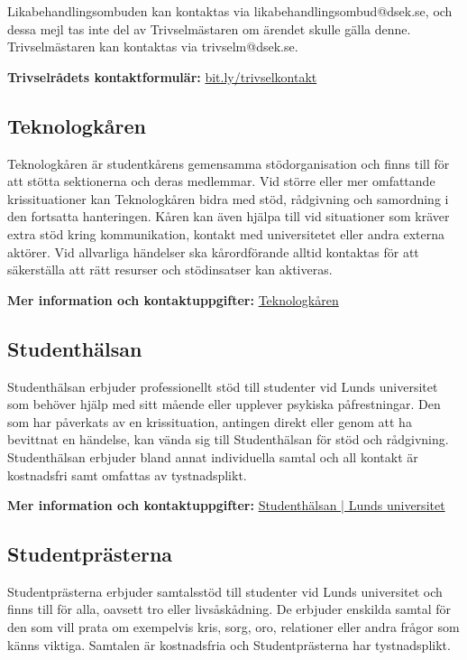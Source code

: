 \documentclass[pdfbookmarks,a4paper,11pt]{article}
\begin{document}
Likabehandlingsombuden kan kontaktas via likabehandlingsombud@dsek.se, och dessa mejl tas inte del av Trivselmästaren om ärendet skulle gälla denne. Trivselmästaren kan kontaktas via trivselm@dsek.se.

\textbf{Trivselrådets kontaktformulär:} \href{https://bit.ly/trivselkontakt}{bit.ly/trivselkontakt}

\subsection{Teknologkåren}

Teknologkåren är studentkårens gemensamma stödorganisation och finns till för att stötta sektionerna och deras medlemmar. Vid större eller mer omfattande krissituationer kan Teknologkåren bidra med stöd, rådgivning och samordning i den fortsatta hanteringen. Kåren kan även hjälpa till vid situationer som kräver extra stöd kring kommunikation, kontakt med universitetet eller andra externa aktörer. Vid allvarliga händelser ska kårordförande alltid kontaktas för att säkerställa att rätt resurser och stödinsatser kan aktiveras. 

\textbf{Mer information och kontaktuppgifter:} \href{https://www.tlth.se/}{Teknologkåren}

\subsection{Studenthälsan}

Studenthälsan erbjuder professionellt stöd till studenter vid Lunds universitet som behöver hjälp med sitt mående eller upplever psykiska påfrestningar. Den som har påverkats av en krissituation, antingen direkt eller genom att ha bevittnat en händelse, kan vända sig till Studenthälsan för stöd och rådgivning. Studenthälsan erbjuder bland annat individuella samtal och all kontakt är kostnadsfri samt omfattas av tystnadsplikt. 

\textbf{Mer information och kontaktuppgifter:} \href{https://www.lu.se/student/studentstod-och-halsa/studenthalsan}{Studenthälsan | Lunds universitet}

\subsection{Studentprästerna}

Studentprästerna erbjuder samtalsstöd till studenter vid Lunds universitet och finns till för alla, oavsett tro eller livsåskådning. De erbjuder enskilda samtal för den som vill prata om exempelvis kris, sorg, oro, relationer eller andra frågor som känns viktiga. Samtalen är kostnadsfria och Studentprästerna har tystnadsplikt.
\end{document}
